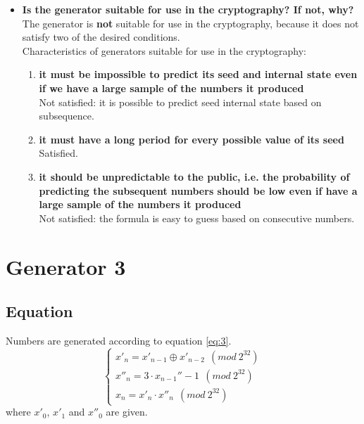 \documentclass[a4paper,10pt]{article}
\begin{document}
\begin{itemize}
 \item \textbf{Is the generator suitable for use in the cryptography? If not, why?} \\
  The generator is \textbf{not} suitable for use in the cryptography, because it does not satisfy two of the desired conditions.\\
 Characteristics of generators suitable for use in the cryptography:
  \begin{enumerate}
   \item \textbf{it must be impossible to predict its seed and internal state even if we have a large sample of the numbers it produced} \\
   Not satisfied: it is possible to predict seed internal state based on subsequence.
   \item \textbf{it must have a long period for every possible value of its seed} \\
   Satisfied.
   \item \textbf{it should be unpredictable to the public, i.e. the probability of predicting the subsequent numbers should be low even if have a large sample of the numbers it produced} \\
   Not satisfied: the formula is easy to guess based on consecutive numbers.
   \end{enumerate}

\end{itemize}


\section{Generator 3}
\subsection{Equation}
Numbers are generated according to equation \ref{eq:3}.
\begin{equation}
\label{eq:3}
\begin{cases}
x'_n = x'_{n-1} \oplus x'_{n-2}\ \ (mod\ 2^{32}) \\ x''_n = 3 \cdot x_{n-1}'' - 1\ \ (mod\ 2^{32}) \\ x_n = x'_n \cdot x''_n\ \ (mod\ 2^{32})
\end{cases}
\end{equation}
where ${x'_0}$, ${x'_1}$ and ${x''_0}$ are given.
\end{document}
